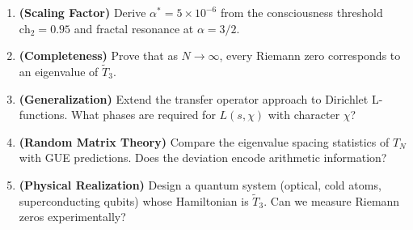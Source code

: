 \begin{enumerate}
\item \textbf{(Scaling Factor)} Derive $\alpha^* = 5 \times 10^{-6}$ from the consciousness threshold $\text{ch}_2 = 0.95$ and fractal resonance at $\alpha = 3/2$.

\item \textbf{(Completeness)} Prove that as $N \to \infty$, every Riemann zero corresponds to an eigenvalue of $\tilde{T}_3$.

\item \textbf{(Generalization)} Extend the transfer operator approach to Dirichlet L-functions. What phases are required for $L(s, \chi)$ with character $\chi$?

\item \textbf{(Random Matrix Theory)} Compare the eigenvalue spacing statistics of $T_N$ with GUE predictions. Does the deviation encode arithmetic information?

\item \textbf{(Physical Realization)} Design a quantum system (optical, cold atoms, superconducting qubits) whose Hamiltonian is $\tilde{T}_3$. Can we measure Riemann zeros experimentally?
\end{enumerate}
